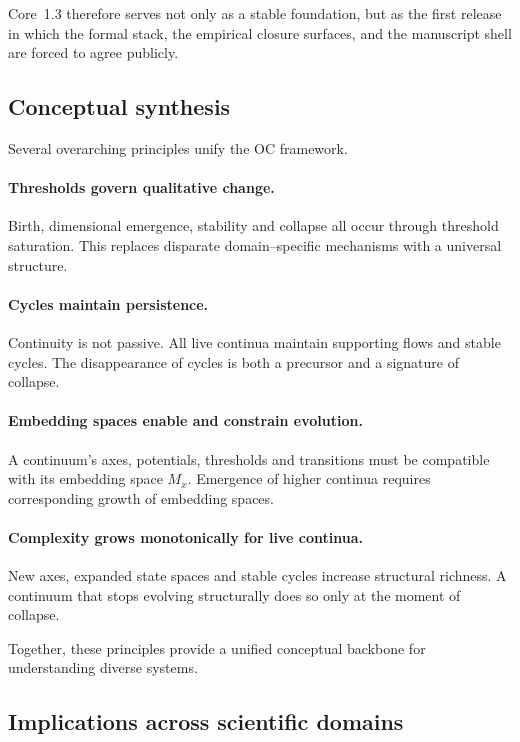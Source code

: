 Core~1.3 therefore serves not only as a stable foundation, but as the first
release in which the formal stack, the empirical closure surfaces, and the
manuscript shell are forced to agree publicly.

\subsection{Conceptual synthesis}

Several overarching principles unify the OC framework.

\paragraph{Thresholds govern qualitative change.}
Birth, dimensional emergence, stability and collapse all occur through threshold saturation.  
This replaces disparate domain–specific mechanisms with a universal structure.

\paragraph{Cycles maintain persistence.}
Continuity is not passive.  
All live continua maintain supporting flows and stable cycles.  
The disappearance of cycles is both a precursor and a signature of collapse.

\paragraph{Embedding spaces enable and constrain evolution.}
A continuum’s axes, potentials, thresholds and transitions must be compatible with its embedding space \(M_x\).  
Emergence of higher continua requires corresponding growth of embedding spaces.

\paragraph{Complexity grows monotonically for live continua.}
New axes, expanded state spaces and stable cycles increase structural richness.  
A continuum that stops evolving structurally does so only at the moment of collapse.

Together, these principles provide a unified conceptual backbone for understanding diverse systems.

\subsection{Implications across scientific domains}

